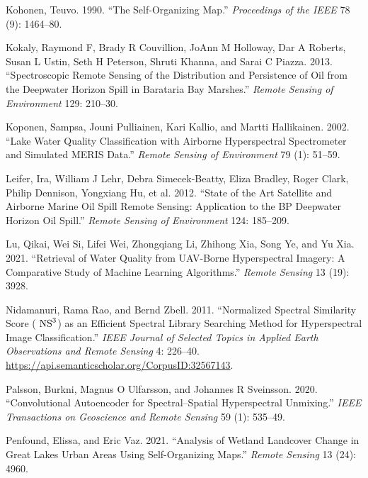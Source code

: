 \documentclass[
  letterpaper,
  DIV=11,
  numbers=noendperiod]{scrartcl}
\newlength{\cslhangindent}
\newenvironment{CSLReferences}[2] %
 {\begin{list}{}{%
  \setlength{\itemindent}{0pt}
  \setlength{\leftmargin}{0pt}
  \setlength{\parsep}{0pt}
  \ifodd #1
   \setlength{\leftmargin}{\cslhangindent}
   \setlength{\itemindent}{-1\cslhangindent}
  \fi
  \setlength{\itemsep}{#2\baselineskip}}}
 {\end{list}}
\begin{document}
\begin{CSLReferences}{1}{0}
Kohonen, Teuvo. 1990. {``The Self-Organizing Map.''} \emph{Proceedings
of the IEEE} 78 (9): 1464--80.

Kokaly, Raymond F, Brady R Couvillion, JoAnn M Holloway, Dar A Roberts,
Susan L Ustin, Seth H Peterson, Shruti Khanna, and Sarai C Piazza. 2013.
{``Spectroscopic Remote Sensing of the Distribution and Persistence of
Oil from the Deepwater Horizon Spill in Barataria Bay Marshes.''}
\emph{Remote Sensing of Environment} 129: 210--30.

Koponen, Sampsa, Jouni Pulliainen, Kari Kallio, and Martti Hallikainen.
2002. {``Lake Water Quality Classification with Airborne Hyperspectral
Spectrometer and Simulated MERIS Data.''} \emph{Remote Sensing of
Environment} 79 (1): 51--59.

Leifer, Ira, William J Lehr, Debra Simecek-Beatty, Eliza Bradley, Roger
Clark, Philip Dennison, Yongxiang Hu, et al. 2012. {``State of the Art
Satellite and Airborne Marine Oil Spill Remote Sensing: Application to
the BP Deepwater Horizon Oil Spill.''} \emph{Remote Sensing of
Environment} 124: 185--209.

Lu, Qikai, Wei Si, Lifei Wei, Zhongqiang Li, Zhihong Xia, Song Ye, and
Yu Xia. 2021. {``Retrieval of Water Quality from UAV-Borne Hyperspectral
Imagery: A Comparative Study of Machine Learning Algorithms.''}
\emph{Remote Sensing} 13 (19): 3928.

Nidamanuri, Rama Rao, and Bernd Zbell. 2011. {``Normalized Spectral
Similarity Score ( \({\hbox{NS}}^{3}\)) as an Efficient Spectral Library
Searching Method for Hyperspectral Image Classification.''} \emph{IEEE
Journal of Selected Topics in Applied Earth Observations and Remote
Sensing} 4: 226--40.
\url{https://api.semanticscholar.org/CorpusID:32567143}.

Palsson, Burkni, Magnus O Ulfarsson, and Johannes R Sveinsson. 2020.
{``Convolutional Autoencoder for Spectral--Spatial Hyperspectral
Unmixing.''} \emph{IEEE Transactions on Geoscience and Remote Sensing}
59 (1): 535--49.

Penfound, Elissa, and Eric Vaz. 2021. {``Analysis of Wetland Landcover
Change in Great Lakes Urban Areas Using Self-Organizing Maps.''}
\emph{Remote Sensing} 13 (24): 4960.


\end{CSLReferences}
\end{document}
